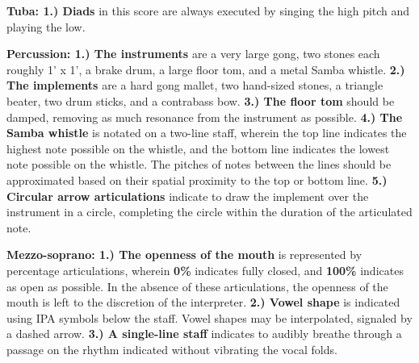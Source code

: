 \documentclass[11pt]{article}
\begin{document}
\begingroup
\textbf{Tuba: 1.) Diads} in this score are always executed by singing the high pitch and playing the low. 
\endgroup

\begingroup
\textbf{Percussion: 1.) The instruments} are a very large gong, two stones each roughly 1' x 1', a brake drum, a large floor tom, and a metal Samba whistle. \textbf{2.) The implements} are a hard gong mallet, two hand-sized stones, a triangle beater, two drum sticks, and a contrabass bow. \textbf{3.) The floor tom} should be damped, removing as much resonance from the instrument as possible. \textbf{4.) The Samba whistle} is notated on a two-line staff, wherein the top line indicates the highest note possible on the whistle, and the bottom line indicates the lowest note possible on the whistle. The pitches of notes between the lines should be approximated based on their spatial proximity to the top or bottom line. \textbf{5.) Circular arrow articulations} indicate to draw the implement over the instrument in a circle, completing the circle within the duration of the articulated note.
\endgroup

\begingroup
\textbf{Mezzo-soprano: 1.) The openness of the mouth} is represented by percentage articulations, wherein \textbf{0\%} indicates fully closed, and \textbf{100\%} indicates as open as possible. In the absence of these articulations, the openness of the mouth is left to the discretion of the interpreter. \textbf{2.) Vowel shape} is indicated using IPA symbols below the staff. Vowel shapes may be interpolated, signaled by a dashed arrow. \textbf{3.) A single-line staff} indicates to audibly breathe through a passage on the rhythm indicated without vibrating the vocal folds.
\endgroup
\end{document}
